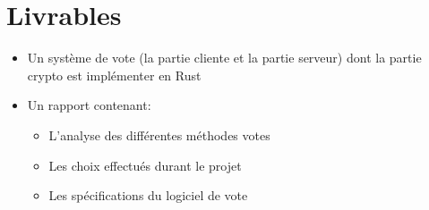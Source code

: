 \documentclass[../report]{subfiles}
\begin{document}
\section{Livrables}
    \begin{itemize}
      \item Un système de vote (la partie cliente et la partie serveur) dont la partie crypto est implémenter en Rust
      \item Un rapport contenant: 
      \begin{itemize}
        \item L'analyse des différentes méthodes votes
        \item Les choix effectués durant le projet
        \item Les spécifications du logiciel de vote
      \end{itemize}
    \end{itemize}
\end{document}
